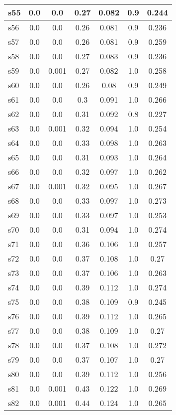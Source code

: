 \documentclass{article}
\begin{document}
\begin{tabular}{|l|c|c|c|c|c|c|}
\hline
s55 &0.0 & 0.0 & 0.27 & 0.082 & 0.9 & 0.244\\
\hline
s56 &0.0 & 0.0 & 0.26 & 0.081 & 0.9 & 0.236\\
\hline
s57 &0.0 & 0.0 & 0.26 & 0.081 & 0.9 & 0.259\\
\hline
s58 &0.0 & 0.0 & 0.27 & 0.083 & 0.9 & 0.236\\
\hline
s59 &0.0 & 0.001 & 0.27 & 0.082 & 1.0 & 0.258\\
\hline
s60 &0.0 & 0.0 & 0.26 & 0.08 & 0.9 & 0.249\\
\hline
s61 &0.0 & 0.0 & 0.3 & 0.091 & 1.0 & 0.266\\
\hline
s62 &0.0 & 0.0 & 0.31 & 0.092 & 0.8 & 0.227\\
\hline
s63 &0.0 & 0.001 & 0.32 & 0.094 & 1.0 & 0.254\\
\hline
s64 &0.0 & 0.0 & 0.33 & 0.098 & 1.0 & 0.263\\
\hline
s65 &0.0 & 0.0 & 0.31 & 0.093 & 1.0 & 0.264\\
\hline
s66 &0.0 & 0.0 & 0.32 & 0.097 & 1.0 & 0.262\\
\hline
s67 &0.0 & 0.001 & 0.32 & 0.095 & 1.0 & 0.267\\
\hline
s68 &0.0 & 0.0 & 0.33 & 0.097 & 1.0 & 0.273\\
\hline
s69 &0.0 & 0.0 & 0.33 & 0.097 & 1.0 & 0.253\\
\hline
s70 &0.0 & 0.0 & 0.31 & 0.094 & 1.0 & 0.274\\
\hline
s71 &0.0 & 0.0 & 0.36 & 0.106 & 1.0 & 0.257\\
\hline
s72 &0.0 & 0.0 & 0.37 & 0.108 & 1.0 & 0.27\\
\hline
s73 &0.0 & 0.0 & 0.37 & 0.106 & 1.0 & 0.263\\
\hline
s74 &0.0 & 0.0 & 0.39 & 0.112 & 1.0 & 0.274\\
\hline
s75 &0.0 & 0.0 & 0.38 & 0.109 & 0.9 & 0.245\\
\hline
s76 &0.0 & 0.0 & 0.39 & 0.112 & 1.0 & 0.265\\
\hline
s77 &0.0 & 0.0 & 0.38 & 0.109 & 1.0 & 0.27\\
\hline
s78 &0.0 & 0.0 & 0.37 & 0.108 & 1.0 & 0.272\\
\hline
s79 &0.0 & 0.0 & 0.37 & 0.107 & 1.0 & 0.27\\
\hline
s80 &0.0 & 0.0 & 0.39 & 0.112 & 1.0 & 0.256\\
\hline
s81 &0.0 & 0.001 & 0.43 & 0.122 & 1.0 & 0.269\\
\hline
s82 &0.0 & 0.001 & 0.44 & 0.124 & 1.0 & 0.265\\

\end{tabular}
\end{document}
